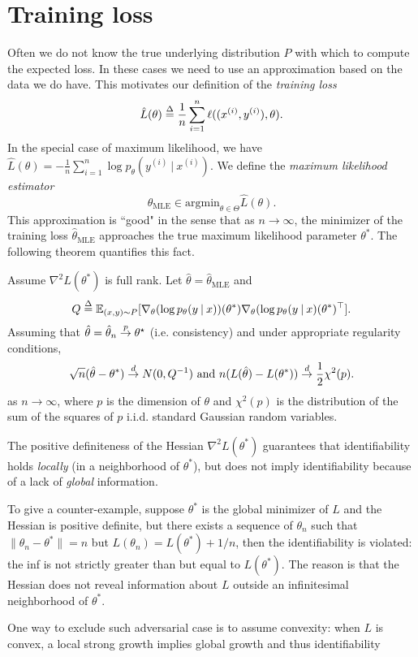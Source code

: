 \section{Training loss}
Often we do not know the true underlying distribution $P$ with which to compute the expected loss. In these cases we need to use an approximation based on the data we do have. This motivates our definition of the \textit{training loss} $$\hat{L}(\theta) \defn \frac1n \sum_{i=1}^n \ell((x^{(i)},y^{(i)}),\theta).$$ In the special case of maximum likelihood, we have $\hat{L}(\theta) = -\frac1n \sum_{i=1}^n \log p_\theta(y^{(i)}\: | \:x^{(i)})$. We define the \textit{maximum likelihood estimator} $$\hat{\theta}_{\mathrm{MLE}} \in \mathrm{argmin}_{\theta\in\Theta} \hat{L}(\theta).$$ This approximation is ``good" in the sense that as $n\rightarrow\infty$, the minimizer of the training loss $\hat{\theta}_\mathrm{MLE}$ approaches the true maximum likelihood parameter $\theta^*$. The following theorem quantifies this fact.
\begin{theorem} \label{mle}
  Assume $\nabla^2 L(\theta^*)$ is full rank. Let $\hat{\theta} = \hat{\theta}_{\mathrm{MLE}}$ and $$Q \defn \E_{(x,y)\sim P}[\nabla_\theta(\log p_\theta(y\: | \: x))(\theta^*) \nabla_\theta(\log p_\theta(y\: | \: x)(\theta^*)^\top].$$
  Assuming that $\hat{\theta}=\hat{\theta}_n\stackrel{\tiny p}{\rightarrow}\theta^\star$ (i.e. consistency) and under appropriate regularity conditions,  $$\sqrt{n}(\hat{\theta}-\theta^*)\stackrel{\tiny d}{\rightarrow} N(0, Q^{-1}) \textup{ and } n(L(\hat{\theta}) - L(\theta^*))\stackrel{\tiny d}{\rightarrow} \frac12 \chi^2(p).$$ as $n\rightarrow\infty$, where $p$ is the dimension of $\theta$ and $\chi^2(p)$ is the distribution of the sum of the squares of $p$ i.i.d. standard Gaussian random variables.
\end{theorem}

\begin{remark}
    The positive definiteness of the Hessian $\nabla^2 L(\theta^\ast)$ guarantees that identifiability holds \emph{locally} (in a neighborhood of $\theta^\ast$), but does not imply identifiability because of a lack of \emph{global} information. 

To give a counter-example, suppose $\theta^\ast$ is the global minimizer of $L$ and the Hessian is positive definite, but there exists a sequence of $\theta_n$ such that $\|\theta_n-\theta^\ast\|=n$ but $L(\theta_n)=L(\theta^\ast)+1/n$, then the identifiability is violated: the inf is not strictly greater than but equal to $L(\theta^\ast)$. The reason is that the Hessian does not reveal information about $L$ outside an infinitesimal neighborhood of $\theta^\ast$.

One way to exclude such adversarial case is to assume convexity: when $L$ is convex, a local strong growth implies global growth and thus identifiability
\end{remark}



